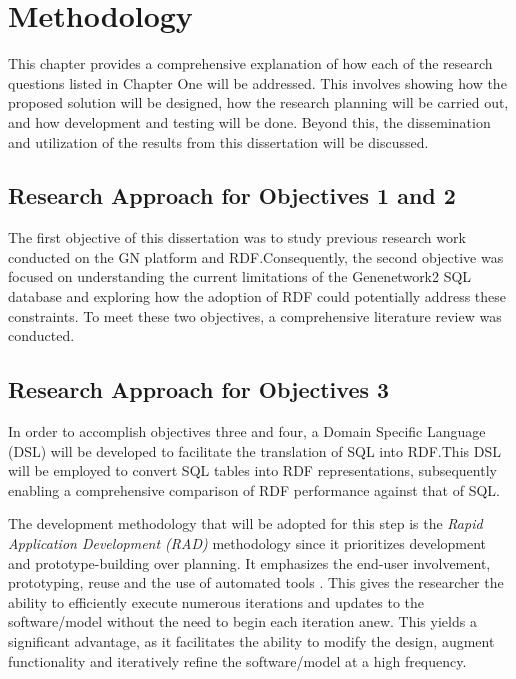 \chapter{Methodology}

This chapter provides a comprehensive explanation of how each of the research questions listed in Chapter One will be addressed.  This involves showing how the proposed solution will be designed, how the research planning will be carried out, and how development and testing will be done.  Beyond this, the dissemination and utilization of the results from this dissertation will be discussed.

\section{Research Approach for Objectives 1 and 2}

The first objective of this dissertation was to study previous research work conducted on the GN platform and RDF.\@  Consequently, the second objective was focused on understanding the current limitations of the Genenetwork2 SQL database and exploring how the adoption of RDF could potentially address these constraints.  To meet these two objectives, a comprehensive literature review was conducted.

\section{Research Approach for Objectives 3}

In order to accomplish objectives three and four, a Domain Specific Language (DSL) will be developed to facilitate the translation of SQL into RDF.\@  This DSL will be employed to convert SQL tables into RDF representations, subsequently enabling a comprehensive comparison of RDF performance against that of SQL\@.

The development methodology that will be adopted for this step is the \textit{Rapid Application Development (RAD)} methodology since it prioritizes development and prototype-building over planning.  It emphasizes the end-user involvement, prototyping, reuse and the use of automated tools \citep*{van2008software}.  This gives the researcher the ability to efficiently execute numerous iterations and updates to the software/model without the need to begin each iteration anew.  This yields a significant advantage, as it facilitates the ability to modify the design, augment functionality and iteratively refine the software/model at a high frequency.

